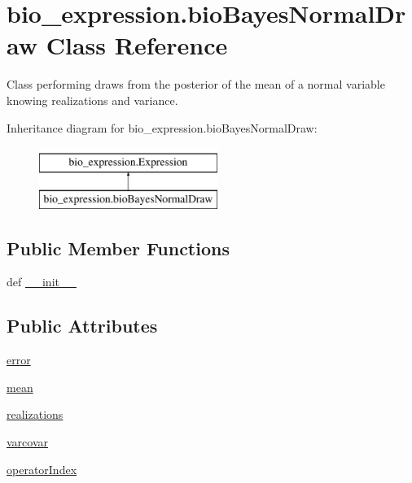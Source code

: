 \hypertarget{classbio__expression_1_1bio_bayes_normal_draw}{\section{bio\+\_\+expression.\+bio\+Bayes\+Normal\+Draw Class Reference}
\label{classbio__expression_1_1bio_bayes_normal_draw}
}


Class performing draws from the posterior of the mean of a normal variable knowing realizations and variance.  


Inheritance diagram for bio\+\_\+expression.\+bio\+Bayes\+Normal\+Draw\+:\begin{figure}[H]
\begin{center}
\leavevmode
\includegraphics[height=2.000000cm]{d9/dc2/classbio__expression_1_1bio_bayes_normal_draw}
\end{center}
\end{figure}
\subsection*{Public Member Functions}
\begin{DoxyCompactItemize}
\item 
def \hyperlink{classbio__expression_1_1bio_bayes_normal_draw_af1feb18ce5fbd3704defb2a28c4d5835}{\+\_\+\+\_\+init\+\_\+\+\_\+}
\end{DoxyCompactItemize}
\subsection*{Public Attributes}
\begin{DoxyCompactItemize}
\item 
\hyperlink{classbio__expression_1_1bio_bayes_normal_draw_a30b0bf4a22a9cb18339f80fac27c7a94}{error}
\item 
\hyperlink{classbio__expression_1_1bio_bayes_normal_draw_a753389533e490c43d924c3885bf7be59}{mean}
\item 
\hyperlink{classbio__expression_1_1bio_bayes_normal_draw_a114f339f8620e3a99143c5012edb9878}{realizations}
\item 
\hyperlink{classbio__expression_1_1bio_bayes_normal_draw_ae7e9d848ba62ec07f1a10e301ebfcb8a}{varcovar}
\item 
\hyperlink{classbio__expression_1_1bio_bayes_normal_draw_a3f4f5dd2af4e503c67ed20f9ddf8809b}{operator\+Index}
\end{DoxyCompactItemize}


